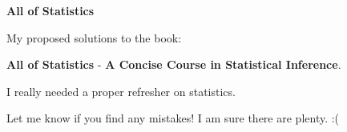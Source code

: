 \noindent
{\Huge \textbf{All of Statistics}}

\bigskip\noindent
My proposed solutions to the book:

\medskip\noindent
{\Large\textbf{All of Statistics}} - \textbf{A Concise Course in Statistical Inference}.%

I really needed a proper refresher on statistics.

\bigskip\noindent
Let me know if you find any mistakes! I am sure there are plenty. :(

\tableofcontents